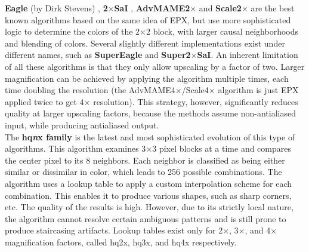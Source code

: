 \documentclass[]{usiinfbachelorproject}
\begin{document}
{\bf Eagle} (by Dirk Stevens) \cite{website:eagle}, {\bf 2$\times$SaI} \cite{Liauw2001}, {\bf AdvMAME2$\times$} \cite{Wiki:scaling} and {\bf Scale2$\times$} \cite{Mazzoleni2001} are the best known algorithms based on the same idea of EPX, but use more sophisticated logic to determine the colors of the 2$\times$2 block, with larger causal neighborhoods and blending of colors. Several slightly different implementations exist under different names, such as {\bf SuperEagle} and {\bf Super2$\times$SaI}. An inherent limitation of all these algorithms is that they only allow upscaling by a factor of two. Larger magnification can be achieved by applying the algorithm multiple times, each time doubling the resolution (the AdvMAME4$\times$/Scale4$\times$ algorithm is just EPX applied twice to get 4$\times$ resolution). This strategy, however, significantly reduces quality at larger upscaling factors, because the methods assume non-antialiased input, while producing antialiased output.\\

The {\bf hq{\it n}x family} \cite{Stepin2003} is the latest and most sophisticated evolution of this type of algorithms. This algorithm examines 3$\times$3 pixel blocks at a time and compares the center pixel to its 8 neighbors. Each neighbor is classified as being either similar or dissimilar in color, which leads to 256 possible combinations. The algorithm uses a lookup table to apply a custom interpolation scheme for each combination. This enables it to produce various shapes, such as sharp corners, etc. The quality of the results is high. However, due to its strictly local nature, the algorithm cannot resolve certain ambiguous patterns and is still prone to produce staircasing artifacts. Lookup tables exist only for 2$\times$, 3$\times$, and 4$\times$ magnification factors, called hq2x, hq3x, and hq4x respectively.
\end{document}
